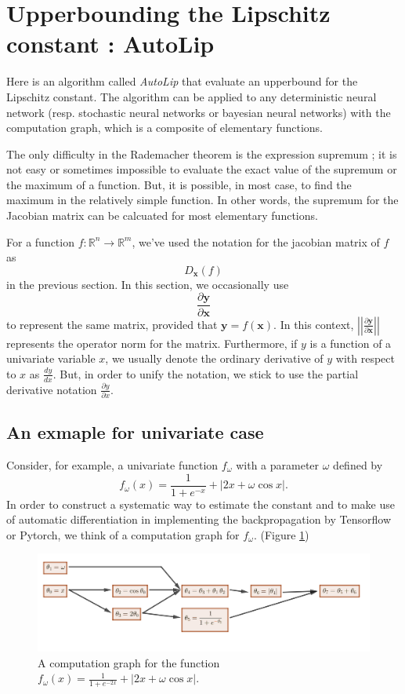 \documentclass[12pt]{report}
\numberwithin{figure}{chapter}
\theoremstyle{plain}
\theoremstyle{definition}
\theoremstyle{corollary}
\theoremstyle{definition}
\theoremstyle{plain}
\theoremstyle{definition}
\theoremstyle{plain}
\begin{document}
\section{Upperbounding the Lipschitz constant : AutoLip}

Here is an algorithm called \emph{AutoLip} that evaluate an upperbound for the Lipschitz constant.
The algorithm can be applied to any deterministic neural network (resp. stochastic neural networks or bayesian neural networks) with the computation graph, which is a composite of elementary functions.

The only difficulty in the Rademacher theorem is the expression supremum ; it is not easy or sometimes impossible to evaluate the exact value of the supremum or the maximum of a function.
But, it is possible, in most case, to find the maximum in the relatively simple function.
In other words, the supremum for the Jacobian matrix can be calcuated for most elementary functions.

For a function \(f:\mathbb R^n\to\mathbb R^m\), we've used the notation for the jacobian matrix of \(f\) as
\[D_{\boldsymbol x}(f)\]
in the previous section.
In this section, we occasionally use
\[\frac{\partial\boldsymbol y}{\partial\boldsymbol x}\]
to represent the same matrix, provided that \(\boldsymbol y=f(\boldsymbol x)\).
In this context, \(\left|\left|\frac{\partial\boldsymbol y}{\partial\boldsymbol x}\right|\right|\) represents the operator norm for the matrix.
Furthermore, if \(y\) is a function of a univariate variable \(x\), we usually denote the ordinary derivative of \(y\) with respect to \(x\) as \(\frac{dy}{dx}\).
But, in order to unify the notation, we stick to use the partial derivative notation \(\frac{\partial y}{\partial x}\).


\subsection{An exmaple for  univariate case}
Consider, for example, a univariate function \(f_\omega\) with a parameter \(\omega\) defined by
\[f_\omega(x) = \frac1{1+e^{-x}}+\left|2x+\omega\cos x\right|.\]
In order to construct a systematic way to estimate the constant and to make use of automatic differentiation in implementing the backpropagation by Tensorflow or Pytorch, we think of a computation graph for \(f_\omega\). (Figure \ref{computation_graph_1})

\begin{figure}[t]
\centering
\includegraphics[width=\textwidth]{computation_graph_1}
\caption{A computation graph for the function \(f_\omega(x)=\frac1{1+e^{-2x}}+\left|2x+\omega\cos x\right|.\)}
\label{computation_graph_1}
\end{figure}
\end{document}
